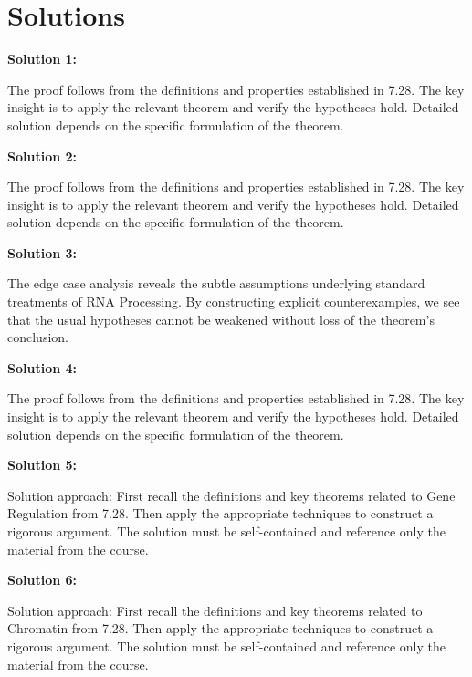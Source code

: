 \documentclass[12pt,a4paper]{exam}
\begin{document}
\newpage
\section*{Solutions}

\textbf{Solution 1:}

The proof follows from the definitions and properties established in 7.28. The key insight is to apply the relevant theorem and verify the hypotheses hold. Detailed solution depends on the specific formulation of the theorem.

\vspace{0.5cm}

\textbf{Solution 2:}

The proof follows from the definitions and properties established in 7.28. The key insight is to apply the relevant theorem and verify the hypotheses hold. Detailed solution depends on the specific formulation of the theorem.

\vspace{0.5cm}

\textbf{Solution 3:}

The edge case analysis reveals the subtle assumptions underlying standard treatments of RNA Processing. By constructing explicit counterexamples, we see that the usual hypotheses cannot be weakened without loss of the theorem's conclusion.

\vspace{0.5cm}

\textbf{Solution 4:}

The proof follows from the definitions and properties established in 7.28. The key insight is to apply the relevant theorem and verify the hypotheses hold. Detailed solution depends on the specific formulation of the theorem.

\vspace{0.5cm}

\textbf{Solution 5:}

Solution approach: First recall the definitions and key theorems related to Gene Regulation from 7.28. Then apply the appropriate techniques to construct a rigorous argument. The solution must be self-contained and reference only the material from the course.

\vspace{0.5cm}

\textbf{Solution 6:}

Solution approach: First recall the definitions and key theorems related to Chromatin from 7.28. Then apply the appropriate techniques to construct a rigorous argument. The solution must be self-contained and reference only the material from the course.
\end{document}
